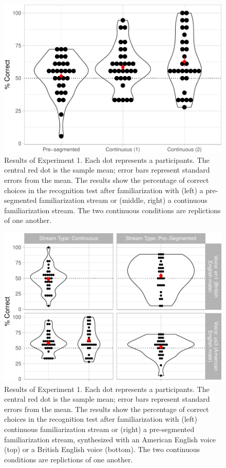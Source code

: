 \documentclass[
]{article}
\begin{document}
\begin{figure}

{\centering \includegraphics[width=0.8\linewidth]{segmentation_recall_combined_for_revision3_files/figure-latex/stats-london-stats.3x.us.segm.cont.plot-1} 

}

\caption{Results of Experiment 1. Each dot represents a participants. The central red dot is the sample mean; error bars represent standard errors from the mean. The results show the percentage of correct choices in the recognition test after familiarization with (left) a pre-segmented familiarization stream or (middle, right) a continuous familiarization stream. The two continuous conditions are replictions of one another.}\label{fig:stats-london-stats.3x.us.segm.cont.plot}
\end{figure}

\begin{figure}

{\centering \includegraphics[width=0.8\linewidth]{segmentation_recall_combined_for_revision3_files/figure-latex/stats-london-stats.3x.us.en.segm.cont.combined.plot-1} 

}

\caption{Results of Experiment 1. Each dot represents a participants. The central red dot is the sample mean; error bars represent standard errors from the mean. The results show the percentage of correct choices in the recognition test after familiarization with (left) continuous familiarization stream or (right) a pre-segmented familiarization stream, synthesized with an American English voice (top) or a British English voice (bottom). The two continuous conditions are replictions of one another.}\label{fig:stats-london-stats.3x.us.en.segm.cont.combined.plot}
\end{figure}
\end{document}

